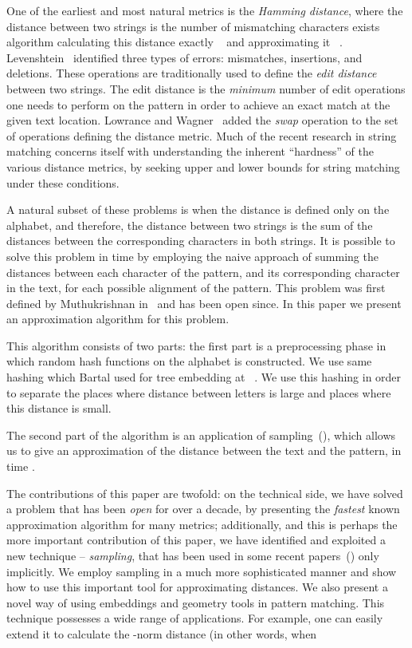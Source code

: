 \documentclass[11pt]{article}
\begin{document}
One of the earliest and most natural metrics is the {\it Hamming
distance}, where the distance between two strings is the number of
mismatching characters exists algorithm calculating this distance
exactly ~\cite{ALP0:00} and approximating it ~\cite{karloff:93}.
Levenshtein~\cite{L-66} identified three types of errors:
mismatches, insertions, and deletions. These operations are
traditionally used to define the {\it edit distance} between two
strings. The edit distance is the {\it minimum} number of edit
operations one needs to perform on the pattern in order to achieve
an exact match at the given text location. Lowrance and
Wagner~\cite{lw-75,wagner-75} added the {\it swap} operation to
the set of operations defining the distance metric.
 Much of the recent research in string matching
concerns itself with understanding the inherent ``hardness'' of
the various distance metrics, by seeking upper and lower bounds
for string matching under these conditions.

A natural subset of these problems is when the distance is defined
only on the alphabet, and therefore, the distance between two
strings is the sum of the distances between the corresponding characters
in both strings. It is possible to solve this problem in time
 by employing the naive approach of summing the
distances between each character of the pattern, and its
corresponding character in the text, for each possible alignment
of the pattern. This problem was first defined by Muthukrishnan
in~\cite{muthu-open} and has been open since. In this paper we
present an approximation algorithm for this problem.

This algorithm
 consists of two parts: the first part is a preprocessing phase in which
random hash functions on the alphabet is constructed. We use same
hashing which Bartal used for tree embedding at ~\cite{Bar96}. We
use this hashing in order to separate the places where distance
between letters is large and places where this distance is small.



 The second part of the algorithm is an application of sampling~(\cite{CPER07}),
which allows us to give an approximation of the distance between
the text and the pattern, in time .

The contributions of this paper are twofold: on the technical
side, we have solved a problem that has been {\em open} for over a
decade, by presenting the {\em fastest} known approximation
algorithm for many metrics; additionally, and this is perhaps the
more important contribution of this paper, we have identified and
exploited a new technique -- {\it sampling}, that has been used in
some recent papers~(\cite{CPER07}) only implicitly. We employ
sampling in a much more sophisticated manner and show how to use
this important tool for approximating distances. We also present a
novel way of using embeddings and geometry tools in pattern
matching. This technique possesses a wide range of applications.
For example, one can easily extend it to calculate the
-norm distance (in other words, when
\end{document}
